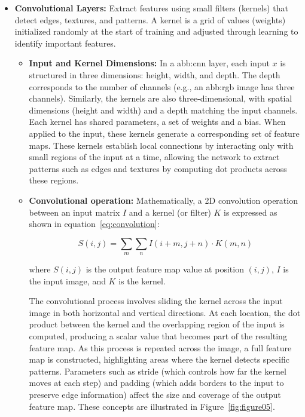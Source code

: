 \begin{itemize}
    \item \textbf{Convolutional Layers:} Extract features using small filters (kernels) that detect edges, textures, and patterns. A kernel is a grid of values (weights) initialized randomly at the start of training and adjusted through learning to identify important features.
     
     
    \begin{itemize}
        \item \textbf{Input and Kernel Dimensions:} In a \gls{abb:cnn} layer, each input $x$ is structured in three dimensions: height, width, and depth. The depth corresponds to the number of channels (e.g., an \gls{abb:rgb} image has three channels). Similarly, the kernels are also three-dimensional, with spatial dimensions (height and width) and a depth matching the input channels. Each kernel has shared parameters, a set of weights and a bias. When applied to the input, these kernels generate a corresponding set of feature maps. These kernels establish local connections by interacting only with small regions of the input at a time, allowing the network to extract patterns such as edges and textures by computing dot products across these regions.
\item \textbf{Convolutional operation:} Mathematically, a 2D convolution operation between an input matrix $I$ and a kernel (or filter) $K$ is expressed as shown in equation~\ref{eq:convolution}:

        \begin{equation}
        S(i, j) = \sum_{m} \sum_{n} I(i + m, j + n) \cdot K(m, n)
        \label{eq:convolution}
        \end{equation}

        where $S(i, j)$ is the output feature map value at position $(i, j)$, $I$ is the input image, and $K$ is the kernel.

        The convolutional process involves sliding the kernel across the input image in both horizontal and vertical directions. At each location, the dot product between the kernel and the overlapping region of the input is computed, producing a scalar value that becomes part of the resulting feature map. As this process is repeated across the image, a full feature map is constructed, highlighting areas where the kernel detects specific patterns. Parameters such as stride (which controls how far the kernel moves at each step) and padding (which adds borders to the input to preserve edge information) affect the size and coverage of the output feature map. These concepts are illustrated in Figure~\ref{fig:figure05}.
     \end{itemize}   
    

\end{itemize}
